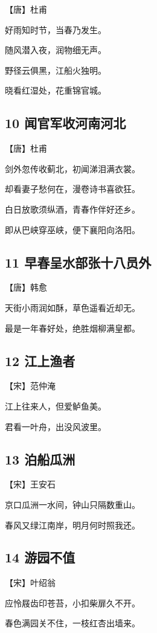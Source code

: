\documentclass[12pt]{article}
\begin{document}
【唐】杜甫

好雨知时节，当春乃发生。

随风潜入夜，润物细无声。

野径云俱黑，江船火独明。

晓看红湿处，花重锦官城。

\subsection*{10 闻官军收河南河北}

【唐】杜甫

剑外忽传收蓟北，初闻涕泪满衣裳。

却看妻子愁何在，漫卷诗书喜欲狂。

白日放歌须纵酒，青春作伴好还乡。

即从巴峡穿巫峡，便下襄阳向洛阳。

\subsection*{11 早春呈水部张十八员外}

【唐】韩愈

天街小雨润如酥，草色遥看近却无。

最是一年春好处，绝胜烟柳满皇都。

\subsection*{12 江上渔者}

【宋】范仲淹

江上往来人，但爱鲈鱼美。

君看一叶舟，出没风波里。

\subsection*{13 泊船瓜洲}

【宋】王安石

京口瓜洲一水间，钟山只隔数重山。

春风又绿江南岸，明月何时照我还。

\subsection*{14 游园不值}

【宋】叶绍翁

应怜屐齿印苍苔，小扣柴扉久不开。

春色满园关不住，一枝红杏出墙来。
\end{document}
